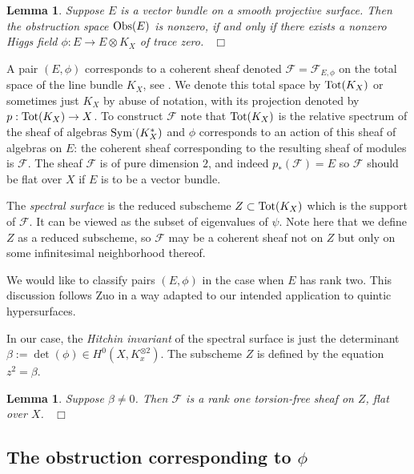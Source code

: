 \documentclass{amsart}
\theoremstyle{plain}
\newtheorem{lemma}[theorem]{Lemma}
\numberwithin{equation}{section}
\begin{document}
\begin{lemma}
Suppose $E$ is a vector bundle on a smooth projective surface. Then the obstruction 
space ${{\rm Obs}} (E)$ is nonzero, if and only if there exists a nonzero Higgs field 
$\phi : E\rightarrow E\otimes K_X$
of trace zero. 
{\ \hfill $\Box$}
\end{lemma}

A pair $(E,\phi )$ corresponds to a coherent sheaf denoted ${{\mathcal F}} = {{\mathcal F}} _{E,\phi}$ on 
the total space of the line bundle $K_X$, see \cite{BNR} \cite{Donagi} \cite{Hitchin} \cite{Zuo}.
We denote this total space by ${\rm Tot}(K_X)$ or sometimes just $K_X$ by abuse of notation,
with its projection denoted by $p:{\rm Tot}(K_X)\rightarrow X$. 
To construct ${{\mathcal F}}$ note that ${\rm Tot}(K_X)$ is the relative spectrum of the
sheaf of algebras ${\rm Sym}^{\cdot}(K_X^{\ast})$ and $\phi$ corresponds to an action
of this sheaf of algebras on $E$: the coherent sheaf corresponding to the resulting sheaf of
modules is ${{\mathcal F}}$. 
The sheaf ${{\mathcal F}} $ is of pure dimension $2$, and indeed $p_{\ast}({{\mathcal F}} )=E$
so ${{\mathcal F}}$ should be flat over $X$ if $E$ is to be a vector bundle. 

The {\em spectral surface} is the reduced subscheme $Z\subset {\rm Tot}(K_X)$ 
which is the support of
${{\mathcal F}}$. It can be viewed as the subset of eigenvalues of $\psi$. Note here that 
we define $Z$ as a reduced subscheme, so ${{\mathcal F}}$ may be a coherent sheaf not on $Z$ but only
on some infinitesimal neighborhood thereof. 

We would like to classify pairs $(E,\phi )$ in the case when $E$ has rank two.
This discussion follows Zuo \cite{Zuo} in a way adapted to our intended application to
quintic hypersurfaces. 

In our case, the {\em Hitchin invariant} of the spectral surface is just the 
determinant $\beta := \det (\phi )\in H^0(X, K_x^{\otimes 2})$. The subscheme $Z$ is defined by the
equation $z^2=\beta$. 

\begin{lemma}
Suppose $\beta \neq 0$. Then ${{\mathcal F}}$ is a rank one torsion-free sheaf on $Z$, flat over $X$. 
{\ \hfill $\Box$}
\end{lemma}

\subsection{The obstruction corresponding to $\phi$}
\end{document}
